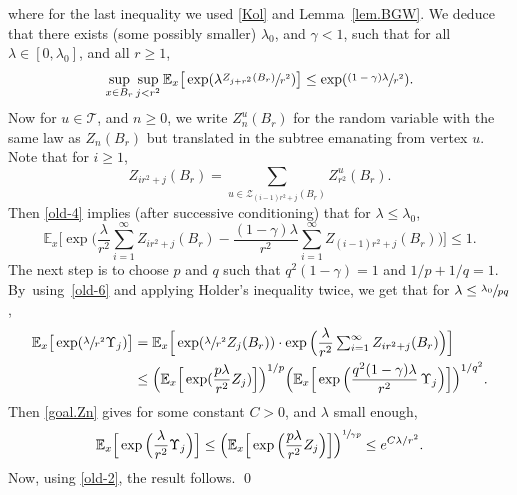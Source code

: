 \documentclass[11pt]{article}
\numberwithin{equation}{section}
\let\ts\textstyle
\theoremstyle{plain}
\theoremstyle{definition}
\newcommand\bE{\mathbb{E}}
\newcommand{\1}{{\text{\Large $\mathfrak 1$}}}
\begin{document}
where for the last inequality we used \eqref{Kol} and Lemma~\ref{lem.BGW}.
We deduce that there exists (some possibly smaller) $\lambda_0$, and $\gamma<1$, such that for
all $\lambda\in[0,\lambda_0]$, and all $r\ge 1$,
\begin{equation}\label{old-4}
\sup_{x\in B_r}\sup_{j<r^2}
\bE_x\big[\exp(\lambda \sfrac{Z_{j+r^2}(B_r)}{r^2})\big]
\le \exp(\sfrac{(1-\gamma)\lambda}{r^2}).
\end{equation}
Now for $u\in \mathcal T$, and $n\ge 0$, we write $Z^u_n(B_r)$ for the random variable with the same law as $Z_n(B_r)$ but translated in the subtree emanating from vertex $u$.
Note that for $i\ge 1$,
\begin{equation*}
Z_{ir^2+j}(B_r)=\sum_{u\in \mathcal Z_{(i-1)r^2+j}(B_r) }
Z^u_{r^2}(B_r).
\end{equation*}
Then \eqref{old-4} implies (after successive conditioning) that for $\lambda\le \lambda_0$,
\begin{equation}\label{old-6}
\bE_x\Big[\exp\Big(\frac{\lambda}{r^2}
\ts\sum_{i=1}^\infty Z_{i r^2+j}(B_r)
-\dfrac{(1-\gamma)\lambda}{r^2}
\sum_{i=1}^\infty Z_{(i-1)r^2+j}(B_r) \Big)\Big]\le 1.
\end{equation}
The next step is to choose $p$ and $q$ such that $q^2(1-\gamma)=1$ and $1/p+1/q=1$.
By~using~\eqref{old-6} and applying Holder's inequality twice, we get that for $\lambda \le \sfrac{\lambda_0}{pq}$,
\begin{equation*}
\begin{split}
\bE_x\big[\exp(\sfrac{\lambda}{r^2}\Upsilon_j)\big]& = \mathbb E_x\Big[\exp(
\sfrac{\lambda}{r^2} Z_j(B_r))\cdot \exp\Big(\dfrac{\lambda}{r^2}
\ts\sum_{i=1}^\infty Z_{ir^2+j}(B_r)\Big)\Big]\\
& \le \Big(\mathbb E_x\Big[\exp(\frac{p\lambda}{r^2} Z_j)\Big]\Big)^{1/p}
\Big(\mathbb E_x\Big[\exp \Big(\frac{q^2(1-\gamma)\lambda}{r^2}\,\Upsilon_j \Big)\Big]\Big)^{1/q^2}.
\end{split}
\end{equation*}
Then \eqref{goal.Zn} gives for some constant $C>0$, and $\lambda$ small enough,
\begin{equation*}
\bE_x \Big[\exp \Big(\frac{\lambda}{r^2}\Upsilon_j \Big) \Big]\le
\Big(\mathbb E_x \Big[\exp \Big(\frac{p\lambda}{r^2} Z_j \Big) \Big]\Big)^{\sfrac 1{\gamma p}}
\le e^{C \lambda/r^2}.
\end{equation*}
Now, using \eqref{old-2}, the result follows. \qed
\end{document}
